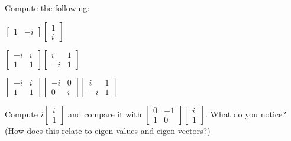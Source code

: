 \documentclass{article}
\newcommand{\mat}[1]{\begin{bmatrix}#1\end{bmatrix}}
\begin{document}
	Compute the following:
	\begin{Enum}
		\item $\mat{1 &-i}\mat{1\\i}$
		\item $\mat{-i&i\\1&1}\mat{i&1\\-i&1}$
		\item $\mat{-i&i\\1&1}\mat{-i&0\\0&i}\mat{i&1\\-i&1}$
		\item Compute $i\mat{i\\1}$ and compare it
			with $\mat{0&-1\\1&0}\mat{i\\1}$.  What do you notice? (How
			does this relate to eigen values and eigen vectors?)
	\end{Enum}
\end{document}
